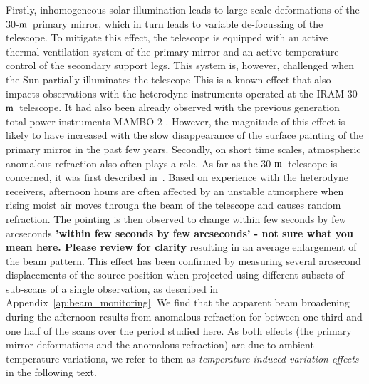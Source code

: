 \documentclass[traditionalabstract]{aa}
\newcommand{\trentemetre}{30-$\rm{m}$}
\newcommand{\lp}[1]{#1}
\newcommand{\LEt}[1]{{\bf {\color[RGB]{0, 153, 255} #1}}}
\begin{document}
{Firstly, inhomogeneous solar illumination leads to large-scale deformations of the
\trentemetre\ primary mirror, which in turn leads to variable de-focussing of the
telescope. {\lp To mitigate this effect, the telescope is equipped with an
  active thermal ventilation system of the primary mirror and an active
  temperature control of the secondary support legs. This system is, however,
  challenged when the Sun partially illuminates the telescope}
  {\lp This is a known effect that also impacts
  observations with the heterodyne instruments operated at the IRAM
  \trentemetre\ telescope. It had also been already observed with the previous
  generation total-power instruments MAMBO-2 \citep{Kreysa1999}.} However, the
magnitude of this effect is likely to have increased with the slow disappearance
of the surface painting of the primary mirror in the past few years.
Secondly, on short time scales, atmospheric anomalous refraction {\lp also often plays a
  role.} As far as the \trentemetre\ telescope is concerned, it was first
described in~\citet{Altenhoff1987}. Based on experience with
  the heterodyne receivers, afternoon hours are
  often affected by an unstable atmosphere when rising moist air moves
  through the beam of the telescope and causes random refraction. The pointing
  is then observed to change within few seconds by few arcseconds\LEt{'within few seconds by few arcseconds' - not sure what you mean here. Please review for clarity} {\lp resulting in an average
    enlargement of the beam pattern.} This effect has been confirmed by
  measuring several arcsecond displacements of the source position when projected using
  different subsets of sub-scans of a single observation, as described
  in Appendix~\ref{ap:beam_monitoring}. We find that the apparent beam broadening during
  the afternoon results from anomalous refraction for between one third
  and one half of the scans over the period studied here.
{\lp As both effects (the primary mirror deformations and the anomalous
  refraction) are due to ambient temperature variations, we refer to them as
  \emph{temperature-induced variation effects} in the following text.}\\

}
\end{document}
